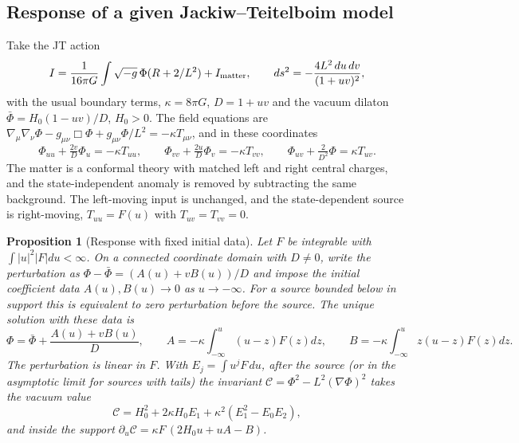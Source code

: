 \documentclass[12pt,a4paper]{article}
\newtheorem{proposition}[theorem]{Proposition}
\begin{document}
\subsection{Response of a given Jackiw--Teitelboim model}
\label{sec:jt}

Take the JT action~\cite{AlmheiriPolchinski2015,Moitra2020}
\begin{equation}
I=\frac1{16\pi G}\int\sqrt{-g}\,\Phi(R+2/L^2)+I_{\rm matter},\qquad
ds^2=-\frac{4L^2\,du\,dv}{(1+uv)^2},
\end{equation}
with the usual boundary terms, $\kappa=8\pi G$, $D=1+uv$ and the vacuum dilaton $\bar\Phi=H_0(1-uv)/D$, $H_0>0$. The field equations are $\nabla_\mu\nabla_\nu\Phi-g_{\mu\nu}\Box\Phi+g_{\mu\nu}\Phi/L^2=-\kappa T_{\mu\nu}$, and in these coordinates
\begin{equation}
\Phi_{uu}+\tfrac{2v}D\Phi_u=-\kappa T_{uu},\qquad
\Phi_{vv}+\tfrac{2u}D\Phi_v=-\kappa T_{vv},\qquad
\Phi_{uv}+\tfrac{2}{D^2}\Phi=\kappa T_{uv} .
\label{eq:jt}
\end{equation}
The matter is a conformal theory with matched left and right central charges, and the state-independent anomaly is removed by subtracting the same background. The left-moving input is unchanged, and the state-dependent source is right-moving, $T_{uu}=F(u)$ with $T_{uv}=T_{vv}=0$.

\begin{proposition}[Response with fixed initial data]
\label{prop:jt}
Let $F$ be integrable with $\int|u|^2|F|du<\infty$. On a connected coordinate domain with $D\ne0$, write the perturbation as $\Phi-\bar\Phi=(A(u)+vB(u))/D$ and impose the initial coefficient data $A(u),B(u)\to0$ as $u\to-\infty$. For a source bounded below in support this is equivalent to zero perturbation before the source. The unique solution with these data is
\begin{equation}
\Phi=\bar\Phi+\frac{A(u)+vB(u)}D,\qquad
A=-\kappa\int_{-\infty}^{u}(u-z)F(z)dz,\qquad
B=-\kappa\int_{-\infty}^{u}z(u-z)F(z)dz .
\label{eq:retarded}
\end{equation}
The perturbation is linear in $F$. With $E_j=\int u^jF\,du$, after the source (or in the asymptotic limit for sources with tails) the invariant $\mathcal C=\Phi^2-L^2(\nabla\Phi)^2$ takes the vacuum value
\begin{equation}
\mathcal C=H_0^2+2\kappa H_0E_1+\kappa^2(E_1^2-E_0E_2),
\label{eq:invariant}
\end{equation}
and inside the support $\partial_u\mathcal C=\kappa F\,(2H_0u+uA-B)$.
\end{proposition}
\end{document}
